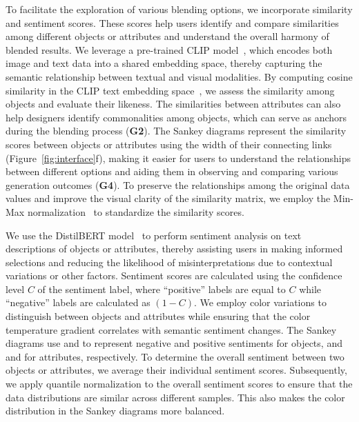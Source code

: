 To facilitate the exploration of various blending options, we incorporate similarity and sentiment scores. 
These scores help users identify and compare similarities among different objects or attributes and understand the overall harmony of blended results.
We leverage a pre-trained CLIP model~\cite{pmlr-v139-radford21a}, which encodes both image and text data into a shared embedding space, thereby capturing the semantic relationship between textual and visual modalities. 
By computing cosine similarity in the CLIP text embedding space~\cite{richardson2024popsphotoinspireddiffusionoperators}, we assess the similarity among objects and evaluate their likeness.
The similarities between attributes can also help designers identify commonalities among objects, which can serve as anchors during the blending process (\textbf{G2}).
The Sankey diagrams represent the similarity scores between objects or attributes using the width of their connecting links (Figure~\ref{fig:interface}f), making it easier for users to understand the relationships between different options and aiding them in observing and comparing various generation outcomes (\textbf{G4}).
To preserve the relationships among the original data values and improve the visual clarity of the similarity matrix, we employ the Min-Max normalization~\cite{10.1007/978-3-031-42536-3_33} to standardize the similarity scores.



We use the DistilBERT model~\cite{sanh2020distilbertdistilledversionbert} to perform sentiment analysis on text descriptions of objects or attributes, thereby assisting users in making informed selections and reducing the likelihood of misinterpretations due to contextual variations or other factors.
Sentiment scores are calculated using the confidence level $C$ of the sentiment label, where ``positive'' labels are equal to $C$ while ``negative'' labels are calculated as $(1-C)$.
We employ color variations to distinguish between objects and attributes while ensuring that the color temperature gradient correlates with semantic sentiment changes.
The Sankey diagrams use  and  to represent negative and positive sentiments for objects, and  and  for attributes, respectively.
To determine the overall sentiment between two objects or attributes, we average their individual sentiment scores.
Subsequently, we apply quantile normalization to the overall sentiment scores to ensure that the data distributions are similar across different samples. This also makes the color distribution in the Sankey diagrams more balanced.



